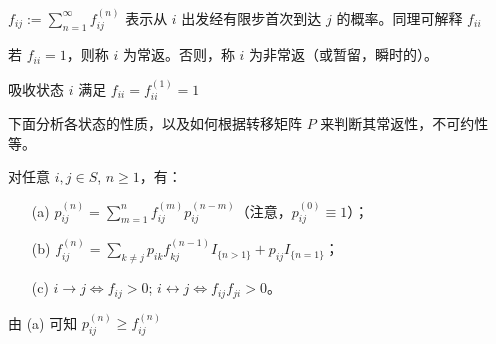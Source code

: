 \documentclass[lang=cn,10pt,thmcnt=section]{elegantbook}
\begin{document}
	$f_{ij} := \sum_{n=1}^{\infty} f_{ij}^{(n)}$ 表示从 $i$ 出发经有限步首次到达 $j$ 的概率。同理可解释 $f_{ii}$

\begin{definition}[常返状态]
	若 $f_{ii} = 1$，则称 $i$ 为常返。否则，称 $i$ 为非常返（或暂留，瞬时的）。

\end{definition}
\begin{remark}

	吸收状态 $i$ 满足 $f_{ii} = f_{ii}^{(1)} = 1$
\end{remark}

下面分析各状态的性质，以及如何根据转移矩阵 $P$ 来判断其常返性，不可约性等。
\begin{theorem}
	对任意 $i, j \in S$, $n \geq 1$，有：
\begin{enumerate}\label{4.4}
    \item[(a)] $p_{ij}^{(n)} = \sum_{m=1}^{n} f_{ij}^{(m)} p_{ij}^{(n-m)}$（注意，$p_{ij}^{(0)} \equiv 1$）；
    \item[(b)] $f_{ij}^{(n)} = \sum_{k \neq j} p_{ik} f_{kj}^{(n-1)} I_{\{n > 1\}} + p_{ij} I_{\{n=1\}}$；
    \item[(c)] $i \rightarrow j \Longleftrightarrow f_{ij} > 0$; $i \leftrightarrow j \Longleftrightarrow f_{ij} f_{ji} > 0$。
\end{enumerate}

\end{theorem}
\begin{remark}
	由 (a) 可知 $p_{ij}^{(n)} \geq f_{ij}^{(n)}$
\end{remark}
\end{document}
